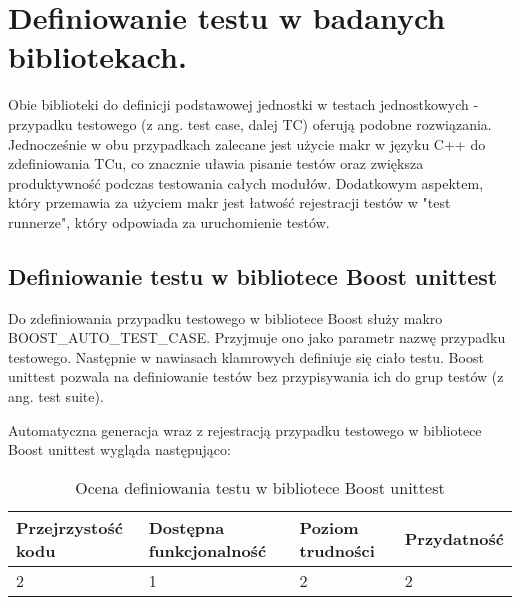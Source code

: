 \documentclass[12pt,a4paper,notitlepage]{report}
\begin{document}
\section{Definiowanie testu w badanych bibliotekach.}

Obie biblioteki do definicji podstawowej jednostki w testach jednostkowych - przypadku testowego (z ang. test case, dalej TC) oferują podobne rozwiązania. Jednocześnie w obu przypadkach zalecane jest użycie makr w języku C++ do zdefiniowania TCu, co znacznie uławia pisanie testów oraz zwiększa produktywność podczas testowania całych modułów.
Dodatkowym aspektem, który przemawia za użyciem makr jest łatwość rejestracji testów w "test runnerze", który odpowiada za uruchomienie testów.



\subsection{Definiowanie testu w bibliotece Boost unittest}

Do zdefiniowania przypadku testowego w bibliotece Boost służy makro BOOST{\_}AUTO{\_}TEST{\_}CASE. Przyjmuje ono jako parametr nazwę przypadku testowego. Następnie w nawiasach klamrowych definiuje się ciało testu. Boost unittest pozwala na definiowanie testów bez przypisywania ich do grup testów (z ang. test suite).

Automatyczna generacja wraz z rejestracją przypadku testowego w bibliotece Boost unittest wygląda następująco:

			

		\begin{center}
			\begin{table}[!ht]
			\caption{Ocena definiowania testu w bibliotece Boost unittest}
			\label{}
			\begin{tabular}[!hc]{|l|l|l|l|}
		\hline
		Przejrzystość kodu 	&	Dostępna funkcjonalność	&	Poziom trudności	&	Przydatność \\ \hline
		2					&	1						&	2					& 	2  			\\ \hline
			\end{tabular}
			\end{table} 
		\end{center}
\end{document}
